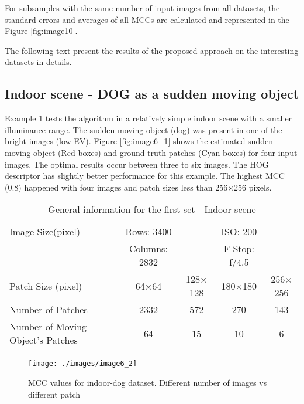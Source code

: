 \documentclass[preprint,12pt,3p]{elsarticle}
\begin{document}
For subsamples with the same number of input images from all datasets, the standard errors and averages of all MCCs are calculated and represented in the Figure \ref{fig:image10}.

The following text present the results of the proposed approach on the interesting datasets in details.

\subsection{Indoor scene - DOG as a sudden moving object}

Example 1 tests the algorithm in a relatively simple indoor scene with a smaller illuminance range.  The sudden moving object (dog) was present in one of the bright images (low EV).  Figure \ref{fig:image6_1} shows the estimated sudden moving object (Red boxes) and ground truth patches (Cyan boxes) for four input images. The optimal results occur between three to six images.  The HOG descriptor has slightly better performance for this example. The highest MCC (0.8) happened with four images and patch sizes less than 256$\times$256 pixels.  
\begin{table}[htbp]
  \centering
  \caption{General information for the first set - Indoor scene}
    \begin{tabular}{l|cccc}
    \hline
    Image Size(pixel) & Rows: 3400 & & ISO: 200  \\
          & Columns: 2832 &  & F-Stop: f/4.5  \\
                  \hline
    Patch Size (pixel) & \multicolumn{1}{c}{64$\times$64} & \multicolumn{1}{c}{128$\times$128} & \multicolumn{1}{c}{180$\times$180} & \multicolumn{1}{c}{256$\times$256} \\
        \hline
    Number of Patches & \multicolumn{1}{c}{2332} & \multicolumn{1}{c}{572} & \multicolumn{1}{c}{270} & \multicolumn{1}{c}{143} \\
    Number of Moving Object's Patches & \multicolumn{1}{c}{64} & \multicolumn{1}{c}{15} & \multicolumn{1}{c}{10} & \multicolumn{1}{c}{6} \\
    \end{tabular}%
  \label{tab:set1}%
\end{table}%

\begin{figure}[h]
\centering
\texttt{[image: ./images/image6\_2]}
\caption{MCC values for indoor-dog dataset. Different number of images vs different patch}
\label{fig:image6_2}
\end{figure}
\end{document}
